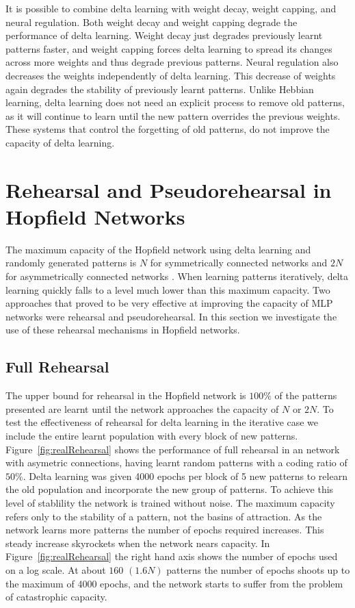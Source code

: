 It is possible to combine delta learning with weight decay, weight capping, and neural regulation.  Both weight decay and weight capping degrade the performance of delta learning.  Weight decay just degrades previously learnt patterns faster, and weight capping forces delta learning to spread its changes across more weights and thus degrade previous patterns.  Neural regulation also decreases the weights independently of delta learning.  This decrease of weights again degrades the stability of previously learnt patterns.  Unlike Hebbian learning, delta learning does not need an explicit process to remove old patterns, as it will continue to learn until the new pattern overrides the previous weights.  These systems that control the forgetting of old patterns, do not improve the capacity of delta learning.


\section{Rehearsal and Pseudorehearsal in Hopfield Networks}
\label{sec:PRSolution}
The maximum capacity of the Hopfield network using delta learning and randomly generated patterns is $N$ for symmetrically connected networks and $2N$ for asymmetrically connected networks \citep{Gardner1987,Gardner1989}.   When learning patterns iteratively, delta learning quickly falls to a level much lower than this maximum capacity. Two approaches that proved to be very effective at improving the capacity of MLP networks were rehearsal and pseudorehearsal.  In this section we investigate the use of these rehearsal mechanisms in Hopfield networks.

\subsection{Full Rehearsal}
\label{sec:FullRehearsal}

The upper bound for rehearsal in the Hopfield network is $100\%$ of the patterns presented are learnt until the network approaches the capacity of $N$ or $2N$.  To test the effectiveness of rehearsal for delta learning in the iterative case we include the entire learnt population with every block of new patterns. Figure~\ref{fig:realRehearsal} shows the performance of full rehearsal in an \hopnet{100\pm}{} network with asymetric connections, having learnt random patterns with a coding ratio of $50\%$.  Delta learning was given 4000 epochs per block of 5 new patterns to relearn the old population and incorporate the new group of patterns.  To achieve this level of stablility the network is trained without noise.  The maximum capacity refers only to the stability of a pattern, not the basins of attraction.  As the network learns more patterns the number of epochs required increases.  This steady increase skyrockets when the network nears capacity.  In Figure~\ref{fig:realRehearsal} the right hand axis shows the number of epochs used on a log scale. At about $160$ $(1.6N)$ patterns the number of epochs shoots up to the maximum of 4000 epochs, and the network starts to suffer from the problem of catastrophic capacity.

